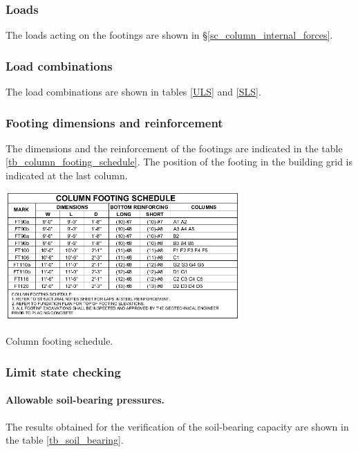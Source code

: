 \subsubsection{Loads}
The loads acting on the footings are shown in \S \ref{sc_column_internal_forces}.

\subsubsection{Load combinations}
The load combinations are shown in tables \ref{ULS} and \ref{SLS}.

\subsubsection{Footing dimensions and reinforcement}
The dimensions and the reinforcement of the footings are indicated in the table \ref{tb_column_footing_schedule}. The position of the footing in the building grid is indicated at the last column.

\begin{table}
  \begin{center}
    \includegraphics[width=90mm]{figures/column_footing_schedule.png}
  \end{center}
    \caption{Column footing schedule.}\label{tb_column_footing_schedule}
\end{table}

\subsubsection{Limit state checking}
\paragraph{Allowable soil-bearing pressures.}
The results obtained for the verification of the soil-bearing capacity are shown in the table \ref{tb_soil_bearing}.

